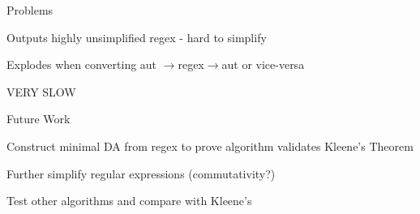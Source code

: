 \documentclass{beamer}
\begin{document}
\begin{frame}{Problems}
	\centering\Large
	
	Outputs highly unsimplified regex - hard to simplify
	
	\vspace{5mm}
	
	Explodes when converting aut $\rightarrow$regex$\rightarrow$aut or vice-versa
	
	\vspace{5mm}
	
	VERY SLOW
\end{frame}

\begin{frame}{Future Work}
	\centering\Large
	
	Construct minimal DA from regex to prove algorithm validates Kleene's Theorem
	
	\vspace{5mm}
	
	Further simplify regular expressions (commutativity?)
	
	\vspace{5mm}
	
	Test other algorithms and compare with Kleene's
\end{frame}
\end{document}
